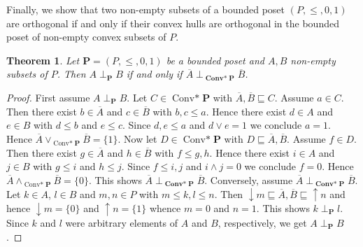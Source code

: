\documentclass[12pt]{article}
\DeclareMathOperator{\Convs}{Conv*}
\DeclareMathOperator{\BConvs}{\mathbf{Conv*}}
\newtheorem{theorem}{Theorem}[section]
\begin{document}
Finally, we show that two non-empty subsets of a bounded poset $(P,\le,0,1)$ are orthogonal if and only if their convex hulls are orthogonal in the bounded poset of non-empty convex subsets of $P$.

\begin{theorem}
Let $\mathbf P=(P,\le,0,1)$ be a bounded poset and $A,B$ non-empty subsets of $P$. Then $A\perp_\mathbf PB$ if and only if $\overline A\perp_{\BConvs\mathbf P}\overline B$.
\end{theorem}

\begin{proof}
First assume $A\perp_\mathbf PB$. Let $C\in\Convs\mathbf P$ with $\overline A,\overline B\sqsubseteq C$. Assume $a\in C$. Then there exist $b\in\overline A$ and $c\in\overline B$ with $b,c\le a$. Hence there exist $d\in A$ and $e\in B$ with $d\le b$ and $e\le c$. Since $d,e\le a$ and $d\vee e=1$ we conclude $a=1$. Hence $\overline A\vee_{\Convs\mathbf P}\overline B=\{1\}$. Now let $D\in\Convs\mathbf P$ with $D\sqsubseteq\overline A,\overline B$. Assume $f\in D$. Then there exist $g\in\overline A$ and $h\in\overline B$ with $f\le g,h$. Hence there exist $i\in A$ and $j\in B$ with $g\le i$ and $h\le j$. Since $f\le i,j$ and $i\wedge j=0$ we conclude $f=0$. Hence $\overline A\wedge_{\Convs\mathbf P}\overline B=\{0\}$. This shows $\overline A\perp_{\BConvs\mathbf P}\overline B$. Conversely, assume $\overline A\perp_{\BConvs\mathbf P}\overline B$. Let $k\in A$, $l\in B$ and $m,n\in P$ with $m\le k,l\le n$. Then $\downarrow m\sqsubseteq\overline A,\overline B\sqsubseteq\uparrow n$ and hence $\downarrow m=\{0\}$ and $\uparrow n=\{1\}$ whence $m=0$ and $n=1$. This shows $k\perp_\mathbf Pl$. Since $k$ and $l$ were arbitrary elements of $A$ and $B$, respectively, we get $A\perp_\mathbf PB$.
\end{proof}



\end{document}
